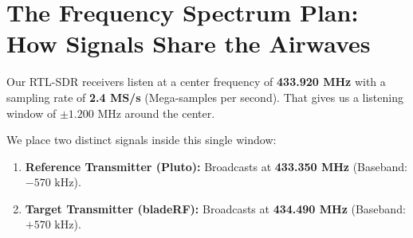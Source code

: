 \documentclass[11pt,a4paper]{article}
\begin{document}
\section{The Frequency Spectrum Plan: How Signals Share the Airwaves}

Our RTL-SDR receivers listen at a center frequency of \textbf{433.920 MHz} with a sampling rate of \textbf{2.4 MS/s} (Mega-samples per second). That gives us a listening window of $\pm 1.200\text{ MHz}$ around the center.

We place two distinct signals inside this single window:
\begin{enumerate}
    \item \textbf{Reference Transmitter (Pluto):} Broadcasts at \textbf{433.350 MHz} (Baseband: $-570\text{ kHz}$).
    \item \textbf{Target Transmitter (bladeRF):} Broadcasts at \textbf{434.490 MHz} (Baseband: $+570\text{ kHz}$).
\end{enumerate}
\end{document}
